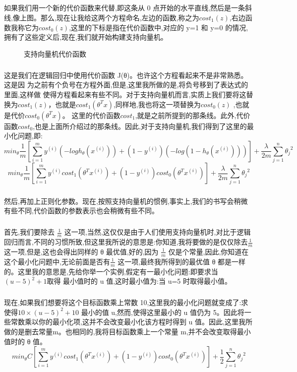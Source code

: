 \documentclass{article}
\begin{document}
\begin{CJK}{UTF8}{gbsn}
\subparagraph{}
如果我们用一个新的代价函数来代替,即这条从 0 点开始的水平直线,然后是一条斜
线,像上图。那么,现在让我给这两个方程命名,左边的函数,称之为$cost_1(z)$,右边函数我称它为$cost_0(z)$,这里的下标是指在代价函数中,对应的 y=1 和 y=0 的情况,拥有了这些定义后,现在,我们就开始构建支持向量机。
\begin{figure}[H]
\caption{支持向量机代价函数}
\label{fig:704}
\end{figure}
\subparagraph{}
这是我们在逻辑回归中使用代价函数 J(θ)。也许这个方程看起来不是非常熟悉。这是因
为之前有个负号在方程外面,但是,这里我所做的是,将负号移到了表达式的里面,这样做
使得方程看起来有些不同。对于支持向量机而言,实质上我们要将这替换为$cost_1(z)$，也就是$cost_1(\theta^Tx)$,同样地,我也将这一项替换为$cost_0(z)$ ,也就是代价$cost_0(\theta^Tx)$。
这里的代价函数$cost_1$,就是之前所提到的那条线。此外,代价函数$cost_0$,也是上面所介绍过的那条线。因此,对于支持向量机,我们得到了这里的最小化问题,即:
\begin{equation}
min_{\theta}\frac{1}{m}[\sum_{i=1}^my^{(i)}(-logh_\theta(x^{(i)}))+(1-y^{(i)})(-log(1-h_\theta(x^{(i)})))]+\frac{\lambda}{2m}\sum_{j=1}^n{\theta_j}^2
\end{equation}
\begin{equation}
min_{\theta}\frac{1}{m}[\sum_{i=1}^my^{(i)}cost_1(\theta^Tx^{(i)})+(1-y^{(i)})cost_0(\theta^Tx^{(i)})]+\frac{\lambda}{2m}\sum_{j=1}^n{\theta_j}^2
\end{equation}
\subparagraph{}
然后,再加上正则化参数。现在,按照支持向量机的惯例,事实上,我们的书写会稍微
有些不同,代价函数的参数表示也会稍微有些不同。
\subparagraph{}
首先,我们要除去 $\frac{1}{m}$ 这一项,当然,这仅仅是由于人们使用支持向量机时,对比于逻辑回归而言,不同的习惯所致,但这里我所说的意思是:你知道,我将要做的是仅仅除去$\frac{1}{m}$ 这一项,但是,这也会得出同样的 θ 最优值,好的,因为 $\frac{1}{m}$ 仅是个常量,因此,你知道在这个最小化问题中,无论前面是否有$\frac{1}{m}$ 这一项,最终我所得到的最优值 θ 都是一样的。这里我的意思是,先给你举一个实例,假定有一最小化问题:即要求当$ (u-5)^2+1 $取得
最小值时的 u 值,这时最小值为:当 u=5 时取得最小值。
\subparagraph{}
现在,如果我们想要将这个目标函数乘上常数 10,这里我的最小化问题就变成了:求
使得$ 10×(u-5)^2+10$ 最小的值 u,然而,使得这里最小的 u 值仍为 5。因此将一些常数乘以你的最小化项,这并不会改变最小化该方程时得到 u 值。因此,这里我所做的是删去常量m。也相同的,我将目标函数乘上一个常量 m,并不会改变取得最小值时的 θ 值。
\begin{equation}
min_{\theta}C[\sum_{i=1}^my^{(i)}cost_1(\theta^Tx^{(i)})+(1-y^{(i)})cost_0(\theta^Tx^{(i)})]+\frac{1}{2}\sum_{j=1}^n{\theta_j}^2

\end{equation}
\end{CJK}
\end{document}

